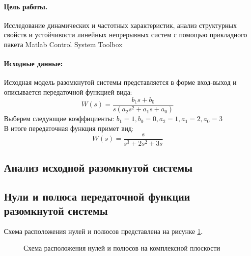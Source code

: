 \documentclass[a4paper,12pt]{article}
\begin{document}
	
	\paragraph{Цель работы.}  Исследование динамических и частотных характеристик, анализ структурных свойств и устойчивости линейных непрерывных систем с помощью прикладного пакета Matlab Control System Toolbox
	\paragraph {Исходные данные:} Исходная модель разомкнутой системы представляется в форме вход-выход и описывается передаточной функцией вида:\\
	\begin{equation}
	\displaystyle W(s)=\frac{b_1s+b_0}{s(a_2s^2+a_1s+a_0)}
	\end{equation}
	Выберем следующие коэффициенты: $b_1=1, b_0=0, a_2=1, a_1=2, a_0=3$\\
	В итоге передаточная функция примет вид:
	\begin{equation}
	\displaystyle W(s)=\frac{s}{s^3+2s^2+3s}
	\label{eq_1}
	\end{equation}
	\newpage
	\begin{center}
		\section{Анализ исходной разомкнутой системы}
	\end{center}
\subsection{Нули и полюса передаточной функции разомкнутой системы}
Схема расположения нулей и полюсов представлена на рисунке \ref{s_1}.
\begin{figure} [h!]
	\centering
	\caption{Схема расположения нулей и полюсов на комплексной плоскости}
	\label{s_1}
\end{figure}
\end{document}

